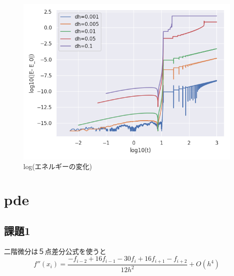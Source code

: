 \documentclass{jsarticle}
\begin{document}
\begin{figure}[htbp]
    \includegraphics[clip,width=15.0cm]{./energy_log.png}
    \caption{log(エネルギーの変化)}
    \label{fig:3}
\end{figure}

\section{pde}
\subsection{課題1}
二階微分は５点差分公式を使うと
\begin{equation}
    f''(x_i) = \frac{-f_{i-2}+16f_{i-1}-30f_{i}+16f_{i+1}-f_{i+2}}{12h^2} + O(h^4)
\end{equation}



\end{document}
